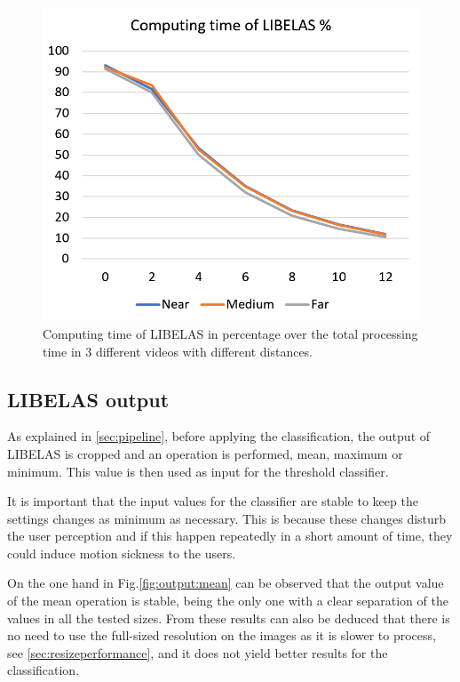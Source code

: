 \documentclass[10pt,a4paper,twocolumn,twoside]{article}
\begin{document}
	\begin{figure}
		\centering
		\includegraphics[width=1\linewidth]{img/ComputingLibelas.PNG}
		\caption{Computing time of LIBELAS in percentage over the total processing time in 3 different videos with different distances.}
		\label{fig:libelaspercentatge}
	\end{figure}
	
	\subsection{LIBELAS output}
	\label{sec:libelasOutput}
	As explained in \ref{sec:pipeline}, before applying the classification, the output of LIBELAS is cropped and an operation is performed, mean, maximum or minimum. This value is then used as input for the threshold classifier.  
	
	It is important that the input values for the classifier are stable to keep the settings changes as minimum as necessary. This is because these changes disturb the user perception and if this happen repeatedly in a short amount of time, they could induce motion sickness to the users.  
	
	On the one hand in Fig.\ref{fig:output:mean} can be observed that the output value of the mean operation is stable, being the only one with a clear separation of the values in all the tested sizes. From these results can also be deduced that there is no need to use the full-sized resolution on the images as it is slower to process, see \ref{sec:resizeperformance}, and it does not yield better results for the classification. 
	
\end{document}
